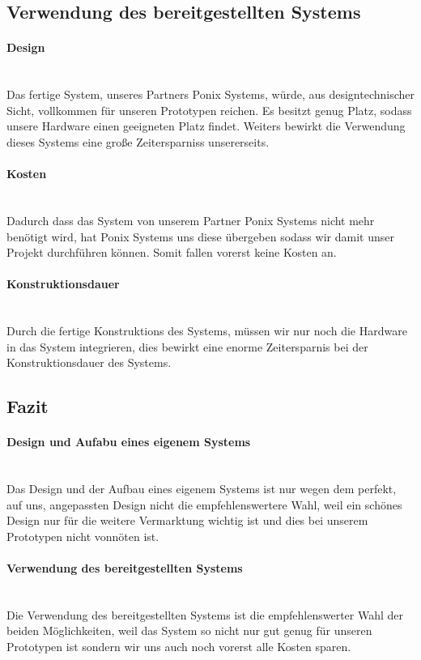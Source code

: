 \documentclass[11pt]{article}
\begin{document}
\subsection{Verwendung des bereitgestellten Systems}

\paragraph{Design} \mbox{}\\
Das fertige System, unseres Partners Ponix Systems, w\"urde, aus designtechnischer Sicht, vollkommen f\"ur unseren Prototypen reichen. Es besitzt genug Platz, sodass unsere Hardware einen geeigneten Platz findet. Weiters bewirkt die Verwendung dieses Systems eine gro{\ss}e Zeitersparniss unsererseits.

\paragraph{Kosten} \mbox{}\\
Dadurch dass das System von unserem Partner Ponix Systems nicht mehr ben\"otigt wird, hat Ponix Systems uns diese \"ubergeben sodass wir damit unser Projekt durchf\"uhren k\"onnen. Somit fallen vorerst keine Kosten an.

\paragraph{Konstruktionsdauer} \mbox{}\\
Durch die fertige Konstruktions des Systems, m\"ussen wir nur noch die Hardware in das System integrieren, dies bewirkt eine enorme Zeitersparnis bei der Konstruktionsdauer des Systems.

\subsection{Fazit}
\paragraph{Design und Aufabu eines eigenem Systems}  \mbox{}\\
Das Design und der Aufbau eines eigenem Systems ist nur wegen dem perfekt, auf uns, angepassten Design nicht die empfehlenswertere Wahl, weil ein sch\"ones Design nur f\"ur die weitere Vermarktung wichtig ist und dies bei unserem Prototypen nicht vonn\"oten ist.
\paragraph{Verwendung des bereitgestellten Systems}  \mbox{}\\
Die Verwendung des bereitgestellten Systems ist die empfehlenswerter Wahl der beiden M\"oglichkeiten, weil das System so nicht nur gut genug f\"ur unseren Prototypen ist sondern wir uns auch noch vorerst alle Kosten sparen.
\end{document}

